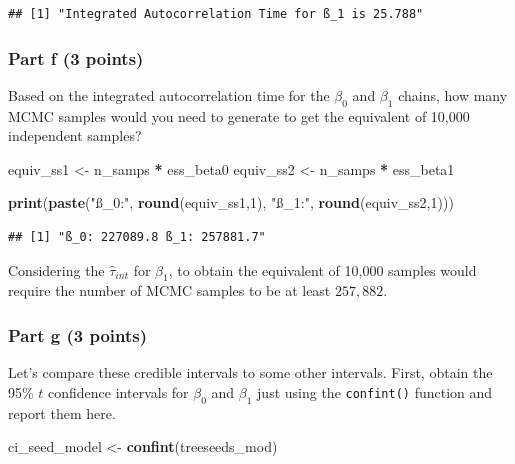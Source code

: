 \documentclass[
]{article}
\newenvironment{Shaded}{\begin{snugshade}}{\end{snugshade}}
\newcommand{\DecValTok}[1]{\textcolor[rgb]{0.00,0.00,0.81}{#1}}
\newcommand{\FunctionTok}[1]{\textcolor[rgb]{0.13,0.29,0.53}{\textbf{#1}}}
\newcommand{\NormalTok}[1]{#1}
\newcommand{\OtherTok}[1]{\textcolor[rgb]{0.56,0.35,0.01}{#1}}
\newcommand{\SpecialCharTok}[1]{\textcolor[rgb]{0.81,0.36,0.00}{\textbf{#1}}}
\newcommand{\StringTok}[1]{\textcolor[rgb]{0.31,0.60,0.02}{#1}}
\begin{document}
\begin{verbatim}
## [1] "Integrated Autocorrelation Time for ß_1 is 25.788"
\end{verbatim}

\hypertarget{part-f-3-points-1}{%
\subsubsection{Part f (3 points)}\label{part-f-3-points-1}}

Based on the integrated autocorrelation time for the \(\beta_0\) and
\(\beta_1\) chains, how many MCMC samples would you need to generate to
get the equivalent of 10,000 independent samples?

\begin{Shaded}
\begin{Highlighting}[]
\NormalTok{equiv\_ss1 }\OtherTok{\textless{}{-}}\NormalTok{ n\_samps }\SpecialCharTok{*}\NormalTok{ ess\_beta0}
\NormalTok{equiv\_ss2 }\OtherTok{\textless{}{-}}\NormalTok{ n\_samps }\SpecialCharTok{*}\NormalTok{ ess\_beta1}

\FunctionTok{print}\NormalTok{(}\FunctionTok{paste}\NormalTok{(}\StringTok{"ß\_0:"}\NormalTok{, }\FunctionTok{round}\NormalTok{(equiv\_ss1,}\DecValTok{1}\NormalTok{), }\StringTok{"ß\_1:"}\NormalTok{, }\FunctionTok{round}\NormalTok{(equiv\_ss2,}\DecValTok{1}\NormalTok{)))}
\end{Highlighting}
\end{Shaded}

\begin{verbatim}
## [1] "ß_0: 227089.8 ß_1: 257881.7"
\end{verbatim}

Considering the \(\hat\tau_{int}\) for \(\beta_1\), to obtain the
equivalent of 10,000 samples would require the number of MCMC samples to
be at least \(257,882\).

\hypertarget{part-g-3-points}{%
\subsubsection{Part g (3 points)}\label{part-g-3-points}}

Let's compare these credible intervals to some other intervals. First,
obtain the 95\% \(t\) confidence intervals for \(\beta_0\) and
\(\beta_1\) just using the \texttt{confint()} function and report them
here.

\begin{Shaded}
\begin{Highlighting}[]
\NormalTok{ci\_seed\_model }\OtherTok{\textless{}{-}} \FunctionTok{confint}\NormalTok{(treeseeds\_mod)}
\end{Highlighting}
\end{Shaded}
\end{document}
